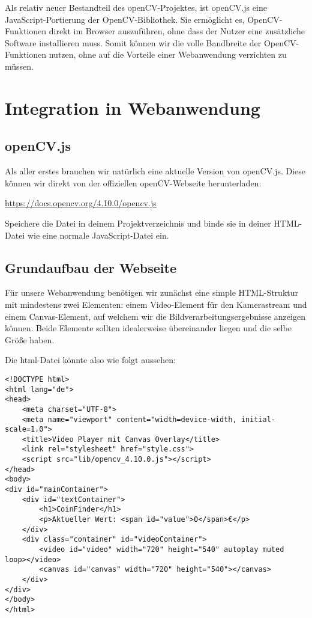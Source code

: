 \documentclass{article}
\begin{document}
Als relativ neuer Bestandteil des openCV-Projektes, ist openCV.js eine JavaScript-Portierung der OpenCV-Bibliothek. Sie ermöglicht es, OpenCV-Funktionen direkt im Browser auszuführen, ohne dass der Nutzer eine zusätzliche Software installieren muss. Somit können wir die volle Bandbreite der OpenCV-Funktionen nutzen, ohne auf die Vorteile einer Webanwendung verzichten zu müssen.

\section{Integration in Webanwendung}
\subsection{openCV.js}
Als aller erstes brauchen wir natürlich eine aktuelle Version von openCV.js. Diese können wir direkt von der offiziellen openCV-Webseite herunterladen:

\href{https://docs.opencv.org/4.10.0/opencv.js}{https://docs.opencv.org/4.10.0/opencv.js}

Speichere die Datei in deinem Projektverzeichnis und binde sie in deiner HTML-Datei wie eine normale JavaScript-Datei ein.

\subsection{Grundaufbau der Webseite}
Für unsere Webanwendung benötigen wir zunächst eine simple HTML-Struktur mit mindestens zwei Elementen: einem Video-Element für den Kamerastream und einem Canvas-Element, auf welchem wir die Bildverarbeitungsergebnisse anzeigen können. Beide Elemente sollten idealerweise übereinander liegen und die selbe Größe haben.

Die html-Datei könnte also wie folgt aussehen:
\begin{lstlisting}[style=HTML]
<!DOCTYPE html>
<html lang="de">
<head>
    <meta charset="UTF-8">
    <meta name="viewport" content="width=device-width, initial-scale=1.0">
    <title>Video Player mit Canvas Overlay</title>
    <link rel="stylesheet" href="style.css">
    <script src="lib/opencv_4.10.0.js"></script>
</head>
<body>
<div id="mainContainer">
    <div id="textContainer">
        <h1>CoinFinder</h1>
        <p>Aktueller Wert: <span id="value">0</span>€</p>
    </div>
    <div class="container" id="videoContainer">
        <video id="video" width="720" height="540" autoplay muted loop></video>
        <canvas id="canvas" width="720" height="540"></canvas>
    </div>
</div>
</body>
</html>
\end{lstlisting}
\end{document}

